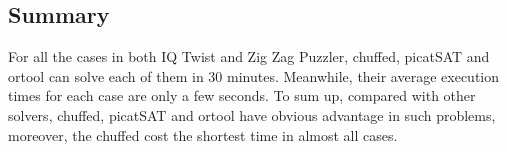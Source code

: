\subsection{Summary}
\label{sec:Summary}
For all the cases in both IQ Twist and Zig Zag Puzzler, chuffed, picatSAT and ortool can solve each of them in 30 minutes. Meanwhile, their average execution times for each case are only a few seconds. To sum up, compared with other solvers, chuffed, picatSAT and ortool have obvious advantage in such problems, moreover, the chuffed cost the shortest time in almost all cases. 
 